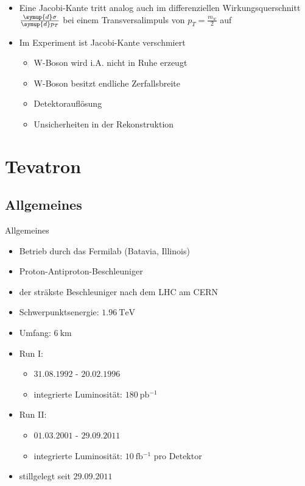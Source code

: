 \documentclass[aspectratio=1610, 9pt]{beamer}
\begin{document}
\begin{frame}
  \begin{itemize}
    \item Eine Jacobi-Kante tritt analog auch im differenziellen Wirkungsquerschnitt $\frac{\symup{d} \sigma}{\symup{d} p_T}$ bei einem Transversalimpuls von $p_T = \frac{m_w}{2}$ auf
    \item Im Experiment ist Jacobi-Kante verschmiert
    \begin{itemize}
      \item[\rightarrow] W-Boson wird i.A. nicht in Ruhe erzeugt
      \item[\rightarrow] W-Boson besitzt endliche Zerfallsbreite
      \item[\rightarrow] Detektorauflösung
      \item[\rightarrow] Unsicherheiten in der Rekonstruktion
    \end{itemize}
  \end{itemize}
\end{frame}

\section{Tevatron}

\subsection{Allgemeines}

\begin{frame}{Allgemeines}
    \begin{itemize}
      \item Betrieb durch das Fermilab (Batavia, Illinois)
      \item Proton-Antiproton-Beschleuniger
      \item der sträkste Beschleuniger nach dem LHC am CERN
      \item Schwerpunktsenergie: $\SI{1,96}{\TeV}$
      \item Umfang: $\SI{6}{\km}$
      \item Run I:
      \begin{itemize}
        \item $31.08.1992$ - $20.02.1996$
        \item integrierte Luminosität: $\SI{180}{\pico \barn^{-1}}$
      \end{itemize}
      \item Run II:
      \begin{itemize}
        \item $01.03.2001$ - $29.09.2011$
        \item integrierte Luminosität: $\SI{10}{\femto \barn^{-1}}$ pro Detektor
      \end{itemize}
      \item stillgelegt seit $29.09.2011$
    \end{itemize}
\end{frame}
\end{document}
